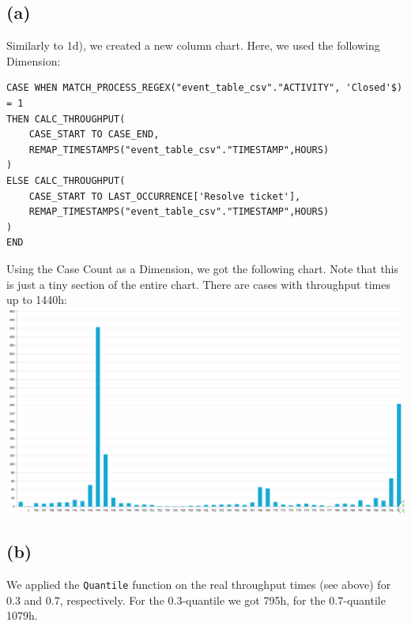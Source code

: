 \documentclass[../../main.tex]{subfiles}
\begin{document}
\subsection*{(a)}
Similarly to 1d), we created a new column chart. Here, we used the following Dimension:
\begin{verbatim}
CASE WHEN MATCH_PROCESS_REGEX("event_table_csv"."ACTIVITY", 'Closed'$) = 1
THEN CALC_THROUGHPUT(
	CASE_START TO CASE_END,
	REMAP_TIMESTAMPS("event_table_csv"."TIMESTAMP",HOURS)
)
ELSE CALC_THROUGHPUT(
	CASE_START TO LAST_OCCURRENCE['Resolve ticket'],
	REMAP_TIMESTAMPS("event_table_csv"."TIMESTAMP",HOURS)
)
END
\end{verbatim}
Using the Case Count as a Dimension, we got the following chart. Note that this is just a tiny section of the entire chart. There are cases with throughput times up to 1440h:\\
\includegraphics[width=\columnwidth]{img/Celonis_a_real_througput_times.png}


\subsection*{(b)}
We applied the \verb|Quantile| function on the real throughput times (see above) for 0.3 and 0.7, respectively.
For the 0.3-quantile we got 795h, for the 0.7-quantile 1079h.
\end{document}
